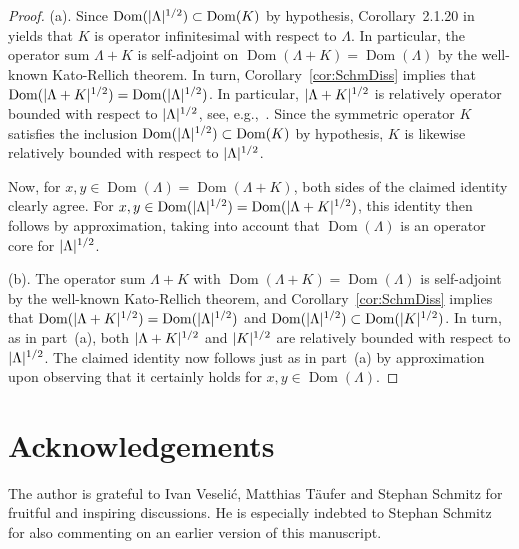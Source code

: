 \documentclass[11pt,a4paper]{amsart}
\numberwithin{equation}{section}
\DeclareMathOperator{\Dom}{Dom}
\DeclarePairedDelimiter{\abs}{|}{|}
\theoremstyle{plain}
\theoremstyle{definition}
\theoremstyle{remark}
\begin{document}
\begin{proof}
  (a).
  Since $\Dom(\abs{\Lambda}^{1/2}) \subset \Dom(K)$ by hypothesis, Corollary~2.1.20 in~\cite{Tre08} yields that $K$ is operator
  infinitesimal with respect to $\Lambda$. In particular, the operator sum $\Lambda+K$ is self-adjoint on
  $\Dom(\Lambda+K) = \Dom(\Lambda)$ by the well-known Kato-Rellich theorem. In turn, Corollary~\ref{cor:SchmDiss} implies that
  $\Dom(\abs{\Lambda+K}^{1/2}) = \Dom(\abs{\Lambda}^{1/2})$. In particular, $\abs{\Lambda+K}^{1/2}$ is relatively operator
  bounded with respect to $\abs{\Lambda}^{1/2}$, see, e.g.,~\cite[Remark~IV.1.5 and Section~V.3.3]{Kato95}. Since the symmetric
  operator $K$ satisfies the inclusion $\Dom(\abs{\Lambda}^{1/2}) \subset \Dom(K)$ by hypothesis, $K$ is likewise relatively
  bounded with respect to $\abs{\Lambda}^{1/2}$.

  Now, for $x,y \in \Dom(\Lambda) = \Dom(\Lambda+K)$, both sides of the claimed identity clearly agree. For
  $x,y \in \Dom(\abs{\Lambda}^{1/2}) = \Dom(\abs{\Lambda+K}^{1/2})$, this identity then follows by approximation, taking into
  account that $\Dom(\Lambda)$ is an operator core for $\abs{\Lambda}^{1/2}$.

  (b).
  The operator sum $\Lambda+K$ with $\Dom(\Lambda+K) = \Dom(\Lambda)$ is self-adjoint by the well-known Kato-Rellich theorem, and
  Corollary~\ref{cor:SchmDiss} implies that $\Dom(\abs{\Lambda+K}^{1/2}) = \Dom(\abs{\Lambda}^{1/2})$ and
  $\Dom(\abs{\Lambda}^{1/2}) \subset \Dom(\abs{K}^{1/2})$. In turn, as in part~(a), both $\abs{\Lambda+K}^{1/2}$ and
  $\abs{K}^{1/2}$ are relatively bounded with respect to $\abs{\Lambda}^{1/2}$. The claimed identity now follows just as in
  part~(a) by approximation upon observing that it certainly holds for $x,y \in \Dom(\Lambda)$.
\end{proof}%

\section*{Acknowledgements}
The author is grateful to Ivan Veseli\'c, Matthias T\"aufer and Stephan Schmitz for fruitful and inspiring discussions. He is
especially indebted to Stephan Schmitz for also commenting on an earlier version of this manuscript.
\end{document}

